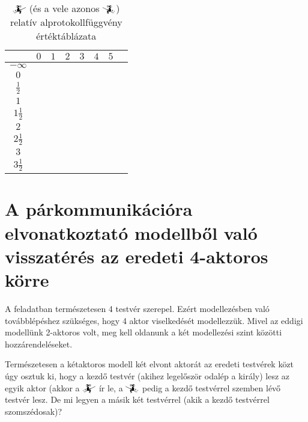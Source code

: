 \documentclass{article}
\newcommand{\blk}{\cellcolor{darkgray}}
\newcommand{\red}{\cellcolor{red!33}}
\newcommand{\grn}{\cellcolor{green!33}}
\newcommand{\nothing}{\text{\raisebox{0.4em}{\rotatebox{180}{$\curvearrowleft$}}}}%
\newcommand{\just}[1]{\boxed{#1}}%
\newcommand{\incl}{\mathbf{incl}}
\newcommand{\excl}{\mathbf{excl}}
\newcommand{\mainfunA}[3]{\mathwitch_{#2}^{#1}#3}
\newcommand{\mainfunB}[3]{\reversemathwitch_{#2}^{#1}#3}
\newcommand{\currymainfunA}{\mathwitch}
\newcommand{\currymainfunB}{\reversemathwitch}
\begin{document}
	\begin{table}[H]
		\caption*{$\currymainfunA$ (és a vele azonos $\currymainfunB$) relatív alprotokollfüggvény értéktáblázata}
		\centering
		\begin{tabular}{c||c|c|c|c|c|c|c|}
				&	$0$		&	$1$		&	$2$		&	$3$		&	$4$		&	$5$		\\\hline\hline
		$-\infty$	&	\nothing	&	\nothing	&	\nothing	&	\nothing	&	\nothing	&	\nothing	\\\hline
			$0$	&	\nothing	&	\nothing	&	\nothing	&	\nothing	&	\nothing	&	\grn\just\incl	\\\hline
		$\frac12$	&	\red\just\excl	&	\nothing	&	\nothing	&	\nothing	&	\nothing	&	\grn\just\incl	\\\hline
			$1$	&	\red\just\excl	&	\nothing	&	\nothing	&	\nothing	&	\grn\just\incl	&	\blk		\\\hline
		$1\frac12$	&	\blk		&	\red\just\excl	&	\nothing	&	\nothing	&	\grn\just\incl	&	\blk		\\\hline
			$2$	&	\blk		&	\red\just\excl	&	\nothing	&	\grn\just\incl	&	\blk		&	\blk		\\\hline
		$2\frac12$	&	\blk		&	\blk		&	\red\just\excl	&	\grn\just\incl	&	\blk		&	\blk		\\\hline
			$3$	&	\blk		&	\blk		&	\blk		&	\blk		&	\blk		&	\blk		\\\hline
		$3\frac12$	&	\blk		&	\blk		&	\blk		&	\blk		&	\blk		&	\blk		\\\hline
		\end{tabular}
	\end{table}

	\section{A párkommunikációra elvonatkoztató modellből való visszatérés az eredeti 4-aktoros körre}

	A feladatban természetesen 4 testvér szerepel. Ezért modellezésben való továbblépéshez szükséges, hogy 4 aktor viselkedését modellezzük.
	Mivel az eddigi modellünk 2-aktoros volt, meg kell oldanunk a két modellezési szint közötti hozzárendeléseket.

	Természetesen a kétaktoros modell két elvont aktorát az eredeti testvérek közt úgy osztuk ki, hogy a kezdő testvér (akihez legelőször odalép a király) lesz az egyik aktor (akkor a $\mainfunA{}{}{}$ ír le, a $\mainfunB{}{}{}$ pedig a kezdő testvérrel szemben lévő testvér lesz. De mi legyen a másik két testvérrel (akik a kezdő testvérrel szomszédosak)?
\end{document}

